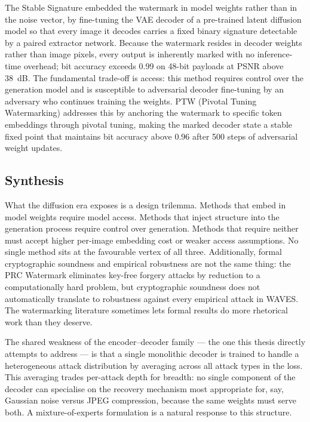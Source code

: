 ﻿\documentclass[12pt, a4paper, twoside]{report}
\numberwithin{equation}{chapter}
\begin{document}
The Stable Signature \cite{fernandez2023} embedded the watermark in model weights rather than in the noise vector, by fine-tuning the VAE decoder of a pre-trained latent diffusion model so that every image it decodes carries a fixed binary signature detectable by a paired extractor network. Because the watermark resides in decoder weights rather than image pixels, every output is inherently marked with no inference-time overhead; bit accuracy exceeds 0.99 on 48-bit payloads at PSNR above 38~dB. The fundamental trade-off is access: this method requires control over the generation model and is susceptible to adversarial decoder fine-tuning by an adversary who continues training the weights. PTW (Pivotal Tuning Watermarking) \cite{fernandez2023ptw} addresses this by anchoring the watermark to specific token embeddings through pivotal tuning, making the marked decoder state a stable fixed point that maintains bit accuracy above 0.96 after 500 steps of adversarial weight updates.

\subsection*{Synthesis}

What the diffusion era exposes is a design trilemma. Methods that embed in model weights require model access. Methods that inject structure into the generation process require control over generation. Methods that require neither must accept higher per-image embedding cost or weaker access assumptions. No single method sits at the favourable vertex of all three. Additionally, formal cryptographic soundness and empirical robustness are not the same thing: the PRC Watermark eliminates key-free forgery attacks by reduction to a computationally hard problem, but cryptographic soundness does not automatically translate to robustness against every empirical attack in WAVES. The watermarking literature sometimes lets formal results do more rhetorical work than they deserve.

The shared weakness of the encoder--decoder family --- the one this thesis directly attempts to address --- is that a single monolithic decoder is trained to handle a heterogeneous attack distribution by averaging across all attack types in the loss. This averaging trades per-attack depth for breadth: no single component of the decoder can specialise on the recovery mechanism most appropriate for, say, Gaussian noise versus JPEG compression, because the same weights must serve both. A mixture-of-experts formulation is a natural response to this structure.
\end{document}
